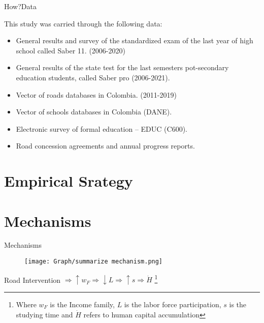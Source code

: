 \documentclass[9pt]{beamer}
\begin{document}
\begin{frame}{How?}{Data}
\label{data}

\justifying 

This study was carried through the following data:
\begin{itemize}
\justifying 
    \item General results and survey of the standardized exam of the last year of high school called Saber 11. (2006-2020) \hyperlink{education}{}\label{contribution} %
    \item General results of the state test for the last semesters pot-secondary education students, called Saber pro (2006-2021).  %
    \item Vector of roads databases in Colombia. (2011-2019)
    \item Vector of schools databases in Colombia (DANE).  
    \item  Electronic survey of formal education – EDUC (C600).     
    \item  Road concession agreements and annual progress reports.
\end{itemize}

\end{frame}
\section{Empirical Srategy}

 \section{Mechanisms}
 \begin{frame}{Mechanisms} \label{roads2} 
\begin{figure} [H]
    \centering
    \renewcommand\thefigure{3.1}
     \texttt{[image: Graph/summarize mechanism.png]}
    \caption{} 
    \label{fig:Figdispertion}
\end{figure}
\begin{center}
{Road Intervention}    $ \Rightarrow   \uparrow w_F     \Rightarrow   \downarrow L  	\Rightarrow    \uparrow s \Rightarrow \dot{H} $  \footnote{\tiny Where $w_F$ is the Income family,   $L$ is the labor force participation, $s$ is the studying time and $\dot{H}$ refers to human capital accumulation}
\end{center}
 \end{frame}
\end{document}
